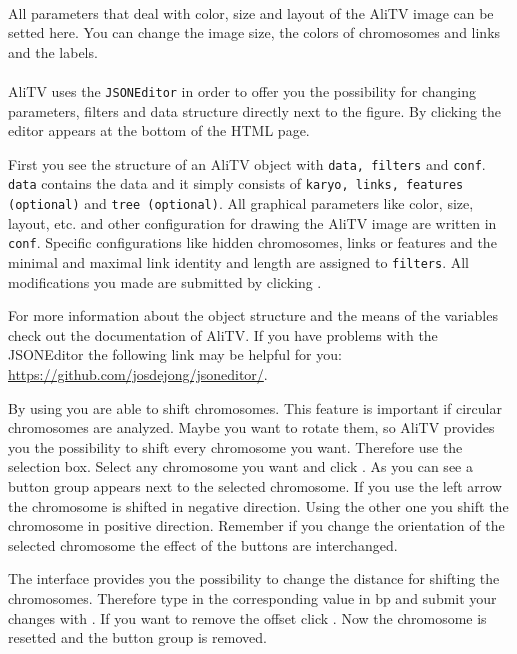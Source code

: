 \documentclass[a4paper]{scrartcl}
\begin{document}
\paragraph*{}
All parameters that deal with color, size and layout of the AliTV image can be setted here. You can change the image size, the colors of chromosomes and links and the labels.

\paragraph*{}
AliTV uses the \texttt{JSONEditor} in order to offer you the possibility for changing parameters, filters and data structure directly next to the figure. By clicking  the editor appears at the bottom of the HTML page. 

First you see the structure of an AliTV object with \texttt{data, filters} and \texttt{conf}. \texttt{data} contains the data and it simply consists of \texttt{karyo, links, features (optional)} and  \texttt{tree (optional)}. All graphical parameters like color, size, layout, etc. and other configuration for drawing the AliTV image are written in \texttt{conf}. Specific configurations like hidden chromosomes, links or features and the minimal and maximal link identity and length are assigned to \texttt{filters}. All modifications you made are submitted by clicking .

For more information about the object structure and the means of the variables check out the documentation of AliTV. If you have problems with the JSONEditor the following link may be helpful for you: \url{https://github.com/josdejong/jsoneditor/}.

By using  you are able to shift chromosomes. This feature is important if circular chromosomes are analyzed. Maybe you want to rotate them, so AliTV provides you the possibility to shift every chromosome you want. Therefore use the selection box. Select any chromosome you want and click . As you can see a button group appears next to the selected chromosome. If you use the left arrow the chromosome is shifted in negative direction. Using the other one you shift the chromosome in positive direction. Remember if you change the orientation of the selected chromosome the effect of the buttons are interchanged.

The interface provides you the possibility to change the distance for shifting the chromosomes. Therefore type in the corresponding value in bp and submit your changes with . If you want to remove the offset click . Now the chromosome is resetted and the button group is removed.
\end{document}
